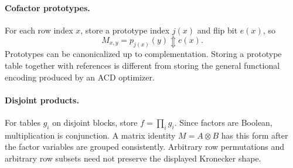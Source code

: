 \documentclass[11pt]{article}
\newcommand{\xor}{\mathbin{\Updownarrow}}
\theoremstyle{definition}\newtheorem{definition}[theorem]{Definition}
\theoremstyle{remark}\newtheorem{remark}[theorem]{Remark}
\begin{document}
\paragraph{Cofactor prototypes.}
For each row index $x$, store a prototype index $j(x)$ and flip bit $e(x)$, so
\begin{equation}
 M_{x,y}=p_{j(x)}(y)\xor e(x).
 \label{eq:cofactor}
\end{equation}
Prototypes can be canonicalized up to complementation. Storing a prototype table together with references is different from storing the general functional encoding produced by an ACD optimizer.

\paragraph{Disjoint products.}
For tables $g_i$ on disjoint blocks, store $f=\prod_i g_i$. Since factors are Boolean, multiplication is conjunction. A matrix identity $M=A\otimes B$ has this form after the factor variables are grouped consistently. Arbitrary row permutations and arbitrary row subsets need not preserve the displayed Kronecker shape.
\end{document}

